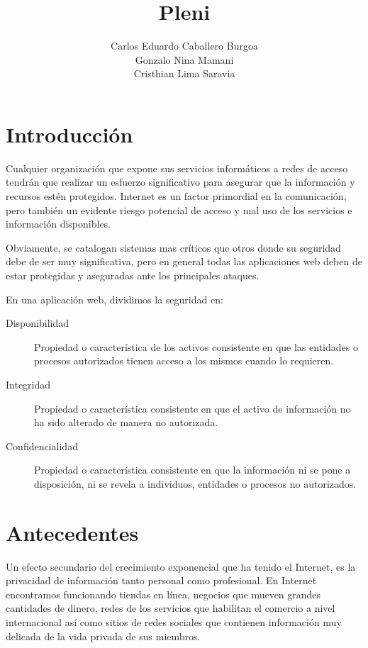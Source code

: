 \documentclass[letter,twoside,11pt]{article}
\title{\bf Pleni}
\author{
    Carlos Eduardo Caballero Burgoa \\
    Gonzalo Nina Mamani \\
    Cristhian Lima Saravia \\
}
\newcommand{\blankpage}{
\newpage
\thispagestyle{empty}
\mbox{}
\newpage
}
\begin{document}
\maketitle

\blankpage
\tableofcontents
\blankpage

\section{Introducción}
Cualquier organización que expone sus servicios informáticos a redes de acceso
tendrán que realizar un esfuerzo significativo para asegurar que la información
y recursos estén protegidos. Internet es un factor primordial en la
comunicación, pero también un evidente riesgo potencial de acceso y mal uso de
los servicios e información disponibles.

Obviamente, se catalogan sistemas mas críticos que otros donde su seguridad debe
de ser muy significativa, pero en general todas las aplicaciones web deben de
estar protegidas y aseguradas ante los principales ataques.

En una aplicación web, dividimos la seguridad en:

\begin{description}
    \item [Disponibilidad] Propiedad o característica de los activos consistente
        en que las entidades o procesos autorizados tienen acceso a los mismos
        cuando lo requieren.
    \item [Integridad] Propiedad o característica consistente en que el activo
        de información no ha sido alterado de manera no autorizada.
    \item [Confidencialidad] Propiedad o característica consistente en que la
        información ni se pone a disposición, ni se revela a individuos,
        entidades o procesos no autorizados.
\end{description}

\section{Antecedentes}
Un efecto secundario del crecimiento exponencial que ha tenido el Internet, es
la privacidad de información tanto personal como profesional. En Internet
encontramos funcionando tiendas en línea, negocios que mueven grandes
cantidades de dinero, redes de los servicios que habilitan el comercio a nivel
internacional así como sitios de redes sociales que contienen información muy
delicada de la vida privada de sus miembros.
\end{document}
